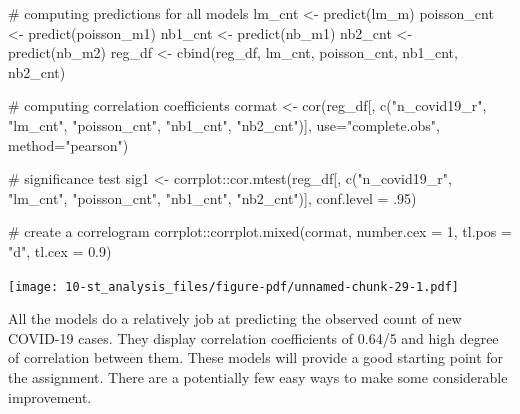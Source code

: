 \documentclass[
  letterpaper,
  DIV=11,
  numbers=noendperiod,
  oneside]{scrreprt}
\newenvironment{Shaded}{\begin{snugshade}}{\end{snugshade}}
\newcommand{\AttributeTok}[1]{\textcolor[rgb]{0.40,0.45,0.13}{#1}}
\newcommand{\CommentTok}[1]{\textcolor[rgb]{0.37,0.37,0.37}{#1}}
\newcommand{\DecValTok}[1]{\textcolor[rgb]{0.68,0.00,0.00}{#1}}
\newcommand{\FloatTok}[1]{\textcolor[rgb]{0.68,0.00,0.00}{#1}}
\newcommand{\FunctionTok}[1]{\textcolor[rgb]{0.28,0.35,0.67}{#1}}
\newcommand{\NormalTok}[1]{\textcolor[rgb]{0.00,0.23,0.31}{#1}}
\newcommand{\OtherTok}[1]{\textcolor[rgb]{0.00,0.23,0.31}{#1}}
\newcommand{\SpecialCharTok}[1]{\textcolor[rgb]{0.37,0.37,0.37}{#1}}
\newcommand{\StringTok}[1]{\textcolor[rgb]{0.13,0.47,0.30}{#1}}
\begin{document}
\begin{Shaded}
\begin{Highlighting}[]
\CommentTok{\# computing predictions for all models}
\NormalTok{lm\_cnt }\OtherTok{\textless{}{-}} \FunctionTok{predict}\NormalTok{(lm\_m)}
\NormalTok{poisson\_cnt }\OtherTok{\textless{}{-}} \FunctionTok{predict}\NormalTok{(poisson\_m1)}
\NormalTok{nb1\_cnt }\OtherTok{\textless{}{-}} \FunctionTok{predict}\NormalTok{(nb\_m1)}
\NormalTok{nb2\_cnt }\OtherTok{\textless{}{-}} \FunctionTok{predict}\NormalTok{(nb\_m2)}
\NormalTok{reg\_df }\OtherTok{\textless{}{-}} \FunctionTok{cbind}\NormalTok{(reg\_df, lm\_cnt, poisson\_cnt, nb1\_cnt, nb2\_cnt)}

\CommentTok{\# computing correlation coefficients}
\NormalTok{cormat }\OtherTok{\textless{}{-}} \FunctionTok{cor}\NormalTok{(reg\_df[, }\FunctionTok{c}\NormalTok{(}\StringTok{"n\_covid19\_r"}\NormalTok{, }\StringTok{"lm\_cnt"}\NormalTok{, }\StringTok{"poisson\_cnt"}\NormalTok{, }\StringTok{"nb1\_cnt"}\NormalTok{, }\StringTok{"nb2\_cnt"}\NormalTok{)], }
              \AttributeTok{use=}\StringTok{"complete.obs"}\NormalTok{, }
              \AttributeTok{method=}\StringTok{"pearson"}\NormalTok{)}

\CommentTok{\# significance test}
\NormalTok{sig1 }\OtherTok{\textless{}{-}}\NormalTok{ corrplot}\SpecialCharTok{::}\FunctionTok{cor.mtest}\NormalTok{(reg\_df[, }\FunctionTok{c}\NormalTok{(}\StringTok{"n\_covid19\_r"}\NormalTok{, }\StringTok{"lm\_cnt"}\NormalTok{, }\StringTok{"poisson\_cnt"}\NormalTok{, }\StringTok{"nb1\_cnt"}\NormalTok{, }\StringTok{"nb2\_cnt"}\NormalTok{)],}
                            \AttributeTok{conf.level =}\NormalTok{ .}\DecValTok{95}\NormalTok{)}

\CommentTok{\# create a correlogram}
\NormalTok{corrplot}\SpecialCharTok{::}\FunctionTok{corrplot.mixed}\NormalTok{(cormat,}
                         \AttributeTok{number.cex =} \DecValTok{1}\NormalTok{,}
                         \AttributeTok{tl.pos =} \StringTok{"d"}\NormalTok{,}
                         \AttributeTok{tl.cex =} \FloatTok{0.9}\NormalTok{)}
\end{Highlighting}
\end{Shaded}

\texttt{[image: 10-st\_analysis\_files/figure-pdf/unnamed-chunk-29-1.pdf]}

All the models do a relatively job at predicting the observed count of
new COVID-19 cases. They display correlation coefficients of 0.64/5 and
high degree of correlation between them. These models will provide a
good starting point for the assignment. There are a potentially few easy
ways to make some considerable improvement.
\end{document}
